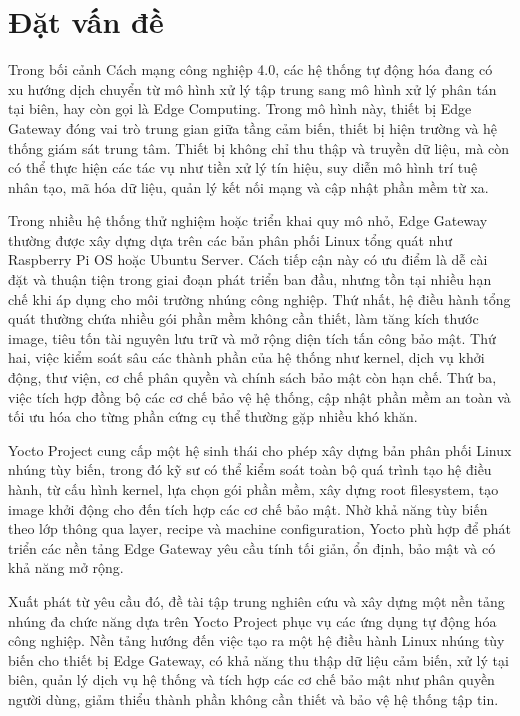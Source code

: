 \section{Đặt vấn đề}

Trong bối cảnh Cách mạng công nghiệp 4.0, các hệ thống tự động hóa đang có xu hướng dịch chuyển từ mô hình xử lý tập trung sang mô hình xử lý phân tán tại biên, hay còn gọi là Edge Computing. Trong mô hình này, thiết bị Edge Gateway đóng vai trò trung gian giữa tầng cảm biến, thiết bị hiện trường và hệ thống giám sát trung tâm. Thiết bị không chỉ thu thập và truyền dữ liệu, mà còn có thể thực hiện các tác vụ như tiền xử lý tín hiệu, suy diễn mô hình trí tuệ nhân tạo, mã hóa dữ liệu, quản lý kết nối mạng và cập nhật phần mềm từ xa.

Trong nhiều hệ thống thử nghiệm hoặc triển khai quy mô nhỏ, Edge Gateway thường được xây dựng dựa trên các bản phân phối Linux tổng quát như Raspberry Pi OS hoặc Ubuntu Server. Cách tiếp cận này có ưu điểm là dễ cài đặt và thuận tiện trong giai đoạn phát triển ban đầu, nhưng tồn tại nhiều hạn chế khi áp dụng cho môi trường nhúng công nghiệp. Thứ nhất, hệ điều hành tổng quát thường chứa nhiều gói phần mềm không cần thiết, làm tăng kích thước image, tiêu tốn tài nguyên lưu trữ và mở rộng diện tích tấn công bảo mật. Thứ hai, việc kiểm soát sâu các thành phần của hệ thống như kernel, dịch vụ khởi động, thư viện, cơ chế phân quyền và chính sách bảo mật còn hạn chế. Thứ ba, việc tích hợp đồng bộ các cơ chế bảo vệ hệ thống, cập nhật phần mềm an toàn và tối ưu hóa cho từng phần cứng cụ thể thường gặp nhiều khó khăn.

Yocto Project cung cấp một hệ sinh thái cho phép xây dựng bản phân phối Linux nhúng tùy biến, trong đó kỹ sư có thể kiểm soát toàn bộ quá trình tạo hệ điều hành, từ cấu hình kernel, lựa chọn gói phần mềm, xây dựng root filesystem, tạo image khởi động cho đến tích hợp các cơ chế bảo mật. Nhờ khả năng tùy biến theo lớp thông qua layer, recipe và machine configuration, Yocto phù hợp để phát triển các nền tảng Edge Gateway yêu cầu tính tối giản, ổn định, bảo mật và có khả năng mở rộng.

Xuất phát từ yêu cầu đó, đề tài tập trung nghiên cứu và xây dựng một nền tảng nhúng đa chức năng dựa trên Yocto Project phục vụ các ứng dụng tự động hóa công nghiệp. Nền tảng hướng đến việc tạo ra một hệ điều hành Linux nhúng tùy biến cho thiết bị Edge Gateway, có khả năng thu thập dữ liệu cảm biến, xử lý tại biên, quản lý dịch vụ hệ thống và tích hợp các cơ chế bảo mật như phân quyền người dùng, giảm thiểu thành phần không cần thiết và bảo vệ hệ thống tập tin.

